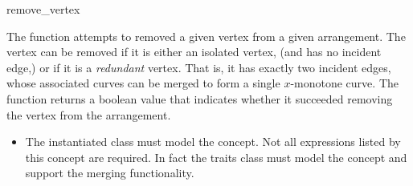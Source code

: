 \ccRefPageBegin

\begin{ccRefFunction}{remove_vertex}

\ccDefinition

The function \ccRefName{} attempts to removed a given vertex from a given
arrangement. The vertex can be removed if it is either an isolated vertex,
(and has no incident edge,) or if it is a {\em redundant} vertex. That
is, it has exactly two incident edges, whose associated curves can be
merged to form a single $x$-monotone curve.
The function returns a boolean value that indicates whether it succeeded
removing the vertex from the arrangement.



\ccRequirements
\begin{itemize}
\item The instantiated  class must model the
   concept. Not all expressions listed 
  by this concept are required. In fact the traits class must model the 
   concept and support the merging
  functionality.
\end{itemize}

\end{ccRefFunction}

\ccRefPageEnd
